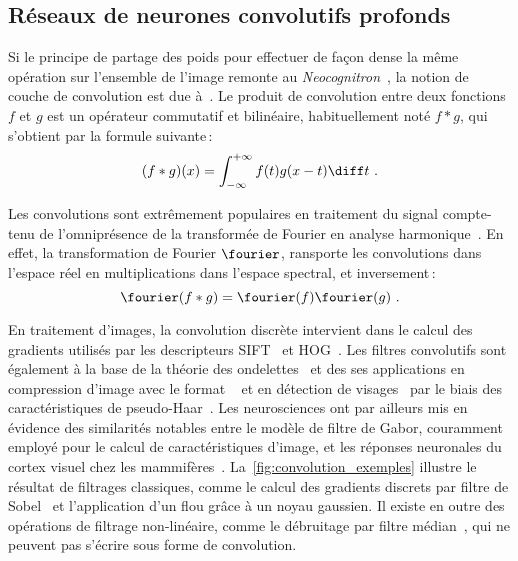 \subsection{Réseaux de neurones convolutifs profonds}

Si le principe de partage des poids pour effectuer de façon dense la même opération sur l'ensemble de l'image remonte au \emph{Neocognitron}~\cite{fukushima_neocognitron_1980}, la notion de couche de convolution est due à~\citet{lecun_gradient-based_1998}. Le produit de convolution entre deux fonctions $f$ et $g$ est un opérateur commutatif et bilinéaire, habituellement noté $f * g$, qui s'obtient par la formule suivante\,:
\begin{equation}
(f * g)(x) = \int_{-\infty}^{+\infty} f(t)g(x-t) \diff t~.
\end{equation}

Les convolutions sont extrêmement populaires en traitement du signal compte-tenu de l'omniprésence de la transformée de Fourier en analyse harmonique~\cite{fourier_propagation_1822}. En effet, la transformation de Fourier $\fourier$, ransporte les convolutions dans l'espace réel en multiplications dans l'espace spectral, et inversement\,:
\begin{equation}
\fourier(f \ast g) = \fourier (f)\fourier (g)~.
\end{equation}

En traitement d'images, la convolution discrète intervient dans le calcul des gradients utilisés par les descripteurs \gls{SIFT}~\cite{lowe_object_1999} et \gls{HOG}~\cite{dalal_histograms_2005}. Les filtres convolutifs sont également à la base de la théorie des ondelettes~\cite{mallat_exploration_2001} et des ses applications en compression d'image avec le format ~\cite{daubechies_ten_1992} et en détection de visages~\citet{viola_robust_2001} par le biais des caractéristiques de pseudo-Haar~\cite{papageorgiou_general_1998}.
Les neurosciences ont par ailleurs mis en évidence des similarités notables entre le modèle de filtre de Gabor, couramment employé pour le calcul de caractéristiques d'image\cite{pati_word_2008}, et les réponses neuronales du cortex visuel chez les mammifères~\cite{marcelja_mathematical_1980,jones_evaluation_1987}. La~\cref{fig:convolution_exemples} illustre le résultat de filtrages classiques, comme le calcul des gradients discrets par filtre de Sobel~\cite{sobel_isotropic_2014} et l'application d'un flou grâce à un noyau gaussien. Il existe en outre des opérations de filtrage non-linéaire, comme le débruitage par filtre médian~\cite{frieden_new_1976}, qui ne peuvent pas s'écrire sous forme de convolution.

